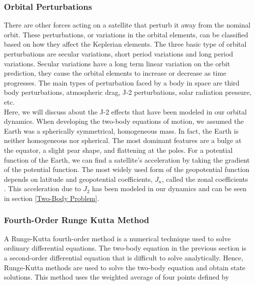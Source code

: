 \documentclass[]{aiaa-tc}%
\begin{document}
\subsubsection{Orbital Perturbations}
\label{orbital perturbations}

There are other forces acting on a satellite that perturb it away from the nominal orbit. These perturbations, or variations in the orbital elements, can be classified based on how they affect the Keplerian elements. The three basic type of orbital perturbations are secular variations, short period variations and long period variations. Secular variations have a long term linear variation on the orbit prediction, they cause the orbital elements to increase or decrease as time progresses. The main types of perturbation faced by a body in space are third body perturbations, atmospheric drag, J-2 perturbations, solar radiation pressure, etc.\\

Here, we will discuss about the J-2 effects that have been modeled in our orbital dynamics. When developing the two-body equations of motion, we assumed the Earth was a spherically symmetrical, homogeneous mass. In fact, the Earth is neither homogeneous nor spherical. The most dominant features are a bulge at the equator, a slight pear shape, and flattening at the poles. For a potential function of the Earth, we can find a satellite's acceleration by taking the gradient of the potential function. The most widely used form of the geopotential function depends on latitude and geopotential coefficients, $J_{n}$, called the zonal coefficients \cite{basics_obital_mechanics}.
This acceleration due to $J_2$ has been modeled in our dynamics and can be seen in section \ref{Two-Body Problem}.
\subsubsection{Fourth-Order Runge Kutta Method}
\label{RKO}

A Runge-Kutta fourth-order method is a numerical technique used to solve ordinary differential equations. The two-body equation in the previous section is a second-order differential equation that is difficult to solve analytically. Hence, Runge-Kutta methods are used to solve the two-body equation and obtain state solutions. This method uses the weighted average of four points defined by \cite{greenberg_advanced_1998}
\end{document}
